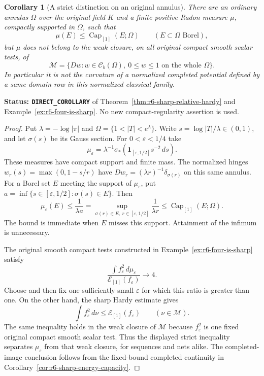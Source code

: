 \documentclass[11pt,a4paper]{article}
\numberwithin{equation}{section}
\newtheorem{corollary}[theorem]{Corollary}
\theoremstyle{definition}
\theoremstyle{remark}
\begin{document}
\begin{corollary}[A strict distinction on an original annulus]
\label{cor:r6-capacity-not-normalized-image}
There are an ordinary annulus $\Omega$ over the original field $K$
and a finite positive Radon measure $\mu$, compactly supported in
$\Omega$, such that
\[
             \mu(E)\le\operatorname{Cap}_{[1]}(E;\Omega)
                    \qquad(E\subset\Omega\text{ Borel}),
\]
but $\mu$ does not belong to the weak closure, on all original compact
smooth scalar tests, of
\[
 \mathcal M=\{D w: w\in\mathcal C_b(\Omega),\ 0\le w\le1
                                      \text{ on the whole }\Omega\}.
\]
In particular it is not the curvature of a normalized completed
potential defined by a same-domain row in this normalized classical
family.
\end{corollary}

\noindent\textbf{Status: \texttt{DIRECT\_COROLLARY}} of
Theorem~\ref{thm:r6-sharp-relative-hardy} and
Example~\ref{ex:r6-four-is-sharp}. No new compact-regularity assertion
is used.

\begin{proof}
Put $\lambda=-\log|\pi|$ and
$\Omega=\{1<|T|<e^\lambda\}$. Write
$s=\log|T|/\lambda\in(0,1)$, and let $\sigma(s)$ be its Gauss section.
For $0<\varepsilon<1/4$ take
\[
 \mu_\varepsilon
    =\lambda^{-1}\sigma_*
                    (\mathbf1_{[\varepsilon,1/2]}s^{-2}\,ds).
\]
These measures have compact support and finite mass. The normalized
hinges $w_r(s)=\max(0,1-s/r)$ have
$D w_r=(\lambda r)^{-1}\delta_{\sigma(r)}$ on this same annulus.
For a Borel set $E$ meeting the support of $\mu_\varepsilon$, put
$a=\inf\{s\in[\varepsilon,1/2]:\sigma(s)\in E\}$. Then
\[
 \mu_\varepsilon(E)\le\frac1{\lambda a}
   =\sup_{\sigma(r)\in E,\ r\in[\varepsilon,1/2]}
                                      \frac1{\lambda r}
   \le\operatorname{Cap}_{[1]}(E;\Omega).
\]
The bound is immediate when $E$ misses this support. Attainment of
the infimum is unnecessary.

The original smooth compact tests constructed in
Example~\ref{ex:r6-four-is-sharp} satisfy
\[
 \frac{\int f_\varepsilon^2\,d\mu_\varepsilon}
      {\mathcal E_{[1]}(f_\varepsilon)}\longrightarrow4.
\]
Choose and then fix one sufficiently small $\varepsilon$ for which
this ratio is greater than one. On the other hand, the sharp Hardy
estimate gives
\[
        \int f_\varepsilon^2\,d\nu
                  \le\mathcal E_{[1]}(f_\varepsilon)
                         \qquad(\nu\in\mathcal M).
\]
The same inequality holds in the weak closure of $\mathcal M$ because
$f_\varepsilon^2$ is one fixed original compact smooth scalar test.
Thus the displayed strict inequality separates
$\mu_\varepsilon$ from that weak closure, for sequences and nets
alike. The completed-image conclusion follows from the fixed-bound
completed continuity in Corollary~\ref{cor:r6-sharp-energy-capacity}.
\end{proof}
\end{document}
